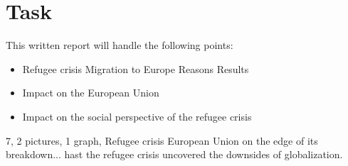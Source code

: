 
\section{Task}
This written report will handle the following points:
\begin{itemize}
	\item Refugee crisis
		\subitem Migration to Europe
		\subitem Reasons
		\subitem Results
	\item Impact on the European Union
	\item Impact on the social perspective of the refugee crisis
\end{itemize}
7, 2 pictures, 1 graph, 	
Refugee crisis European Union on the edge of its breakdown... hast the refugee crisis uncovered the downsides of globalization.

\clearpage
